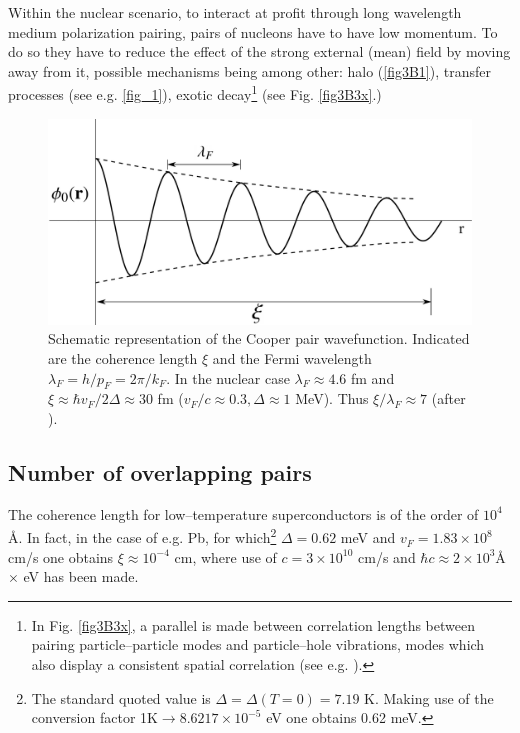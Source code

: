 \begin{subappendices}
     
     Within the nuclear scenario, to interact at profit through long wavelength medium polarization pairing, pairs of nucleons have to have low momentum. To do so they have to reduce the effect of the strong external (mean) field by moving away from it, possible mechanisms being among other: halo (\ref{fig3B1}), transfer processes (see e.g. \ref{fig_1}), exotic decay\footnote{In Fig. \ref{fig3B3x}, a parallel is made between correlation lengths between pairing particle--particle modes and particle--hole vibrations, modes which also display a consistent spatial correlation (see e.g. \cite{Broglia:71}).} (see Fig. \ref{fig3B3x}.)    


 
 
   \begin{figure}
   	\centerline{\includegraphics*[width=12cm,angle=0	]{nutshell/figs/fig3B2}}
   	\caption{Schematic representation of the Cooper pair wavefunction. Indicated are the coherence length $\xi$ and the Fermi wavelength $\lambda_F=h/p_F=2\pi/k_F$. In the nuclear case $\lambda_F\approx4.6$ fm and $\xi\approx \hbar v_F/2\Delta\approx30$ fm ($v_F/c\approx0.3, \Delta\approx 1$ MeV). Thus $\xi/\lambda_F\approx 7$ (after \cite{Weisskopf:81}).}\label{fig3B2}
   \end{figure}




\subsection{Number of overlapping pairs}
The coherence length for low--temperature superconductors is of the order of $10^4$\AA. In fact, in the case of e.g. Pb, for which\footnote{\label{foot75} The standard quoted value is $\Delta=\Delta(T=0)=7.19$ K. Making use of the conversion factor 1K$\rightarrow 8.6217\times10^{-5}$ eV one obtains 0.62 meV.} $\Delta=0.62$ meV and $v_F=1.83\times10^8$ cm/s one obtains $\xi\approx10^{-4}$ cm, where use of $c=3\times10^{10}$ cm/s and $\hbar c\approx 2\times10^3 $\AA$\times$  eV has been made. 



\end{subappendices}
